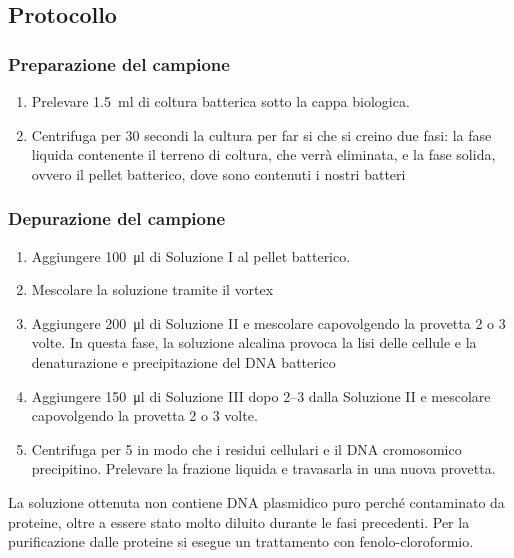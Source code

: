 \subsection{Protocollo}
\subsubsection{Preparazione del campione}
\begin{enumerate}
	\item Prelevare \qty{1.5}{\ml} di coltura batterica sotto la cappa biologica.          
	\item Centrifuga per 30 secondi la cultura per far si che si creino due fasi: la fase liquida contenente il terreno di coltura, che verrà eliminata, e la fase solida, ovvero il pellet batterico, dove sono contenuti i nostri batteri            
\end{enumerate}
\subsubsection{Depurazione del campione}
\begin{enumerate}
	\item Aggiungere \qty{100}{\micro\litre} di Soluzione I al pellet batterico.
	\item Mescolare la soluzione tramite il \foreignlanguage{english}{vortex}
	\item Aggiungere \qty{200}{\micro\litre} di Soluzione II e mescolare capovolgendo la provetta 2 o 3 volte. In questa fase, la soluzione alcalina provoca la lisi delle cellule e la denaturazione e precipitazione del DNA batterico    
	\item Aggiungere \qty{150}{\micro\litre} di Soluzione III dopo \qtyrange{2}{3}{\min} dalla Soluzione II e mescolare capovolgendo la provetta 2 o 3 volte.    
	\item Centrifuga per \qty{5}{\min} in modo che i residui cellulari e il DNA cromosomico precipitino. Prelevare la frazione liquida e travasarla in una nuova provetta.
\end{enumerate}
La soluzione ottenuta non contiene DNA plasmidico puro perché contaminato da proteine, oltre a essere stato molto diluito durante le fasi precedenti. Per la purificazione dalle proteine si esegue un trattamento con fenolo-cloroformio.
